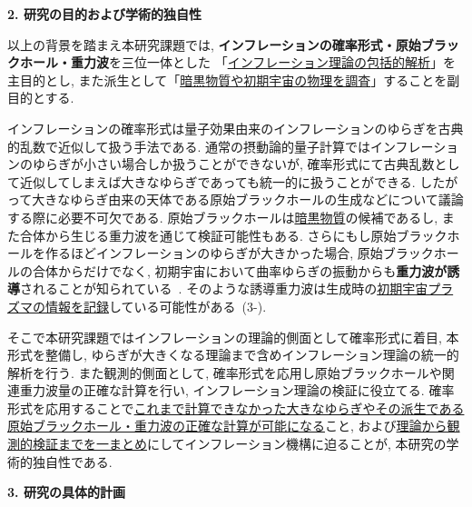\documentclass[11pt,a4paper,uplatex,dvipdfmx]{ujarticle} 		%
\newcommand{\研究課題名}{確率解析・原始ブラックホール・重力波観測から迫るインフレーション}
\newcommand{\研究機関名}{名古屋大学}
\newcommand{\研究代表者氏名}{多田祐一郎}
\newcommand{\研究期間の最終元号年度}{6}  %
\renewcommand{\emph}[1]{{\sffamily\gtfamily\bfseries #1}}
\begin{document}
\begin{mdframed}[roundcorner=0.5zw,
	innertopmargin=0.8zw,innerbottommargin=0.8zw,
	linecolor=black!50,linewidth=0.2zw,
	backgroundcolor=black!10]
	{\bfseries\gtfamily\sffamily\large 2. 研究の目的および学術的独自性}
\end{mdframed}

\noindent
以上の背景を踏まえ本研究課題では, \emph{インフレーションの確率形式・原始ブラックホール・重力波}を三位一体とした
「\ul{インフレーション理論の包括的解析}」を主目的とし,
また派生として「\ul{暗黒物質や初期宇宙の物理を調査}」することを副目的とする.

インフレーションの確率形式は量子効果由来のインフレーションのゆらぎを古典的乱数で近似して扱う手法である.
通常の摂動論的量子計算ではインフレーションのゆらぎが小さい場合しか扱うことができないが,
確率形式にて古典乱数として近似してしまえば大きなゆらぎであっても統一的に扱うことができる.
したがって大きなゆらぎ由来の天体である原始ブラックホールの生成などについて議論する際に必要不可欠である.
原始ブラックホールは\ul{暗黒物質}の候補であるし, また合体から生じる重力波を通じて検証可能性もある.
さらにもし原始ブラックホールを作るほどインフレーションのゆらぎが大きかった場合,
原始ブラックホールの合体からだけでなく, 初期宇宙において曲率ゆらぎの振動からも\emph{重力波が誘導}されることが知られている~\cite{Saito:2008jc}.
そのような誘導重力波は生成時の\ul{初期宇宙プラズマの情報を記録}している可能性がある~(3-\cite{Abe:2020sqb}).

そこで本研究課題ではインフレーションの理論的側面として確率形式に着目, 本形式を整備し, 
ゆらぎが大きくなる理論まで含めインフレーション理論の統一的解析を行う.
また観測的側面として, 確率形式を応用し原始ブラックホールや関連重力波量の正確な計算を行い, インフレーション理論の検証に役立てる.
確率形式を応用することで\ul{これまで計算できなかった大きなゆらぎやその派生である原始ブラックホール・重力波の正確な計算が可能になる}こと,
および\ul{理論から観測的検証までを一まとめ}にしてインフレーション機構に迫ることが, 本研究の学術的独自性である.


\begin{mdframed}[roundcorner=0.5zw,
	innertopmargin=0.8zw,innerbottommargin=0.8zw,
	linecolor=black!50,linewidth=0.2zw,
	backgroundcolor=black!10]
	{\bfseries\gtfamily\sffamily\large 3. 研究の具体的計画}
\end{mdframed}
\end{document}
